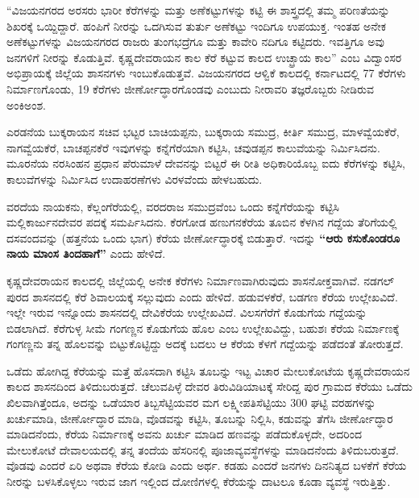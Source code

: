 “ವಿಜಯನಗರದ ಅರಸರು ಭಾರೀ ಕೆರೆಗಳನ್ನು ಮತ್ತು ಅಣೆಕಟ್ಟುಗಳನ್ನು ಕಟ್ಟಿ ಈ ಶಾಸ್ತ್ರದಲ್ಲಿ ತಮ್ಮ ಪರಿಣತೆಯನ್ನು ಶಿಖರಕ್ಕೆ ಒಯ್ದಿದ್ದಾರೆ. ಹಂಪಿಗೆ ನೀರನ್ನು ಒದಗಿಸುವ ತುರ್ತು ಅಣೆಕಟ್ಟು ಇಂದಿಗೂ ಉಪಯುಕ್ತ. ಇಂತಹ ಅನೇಕ ಅಣೆಕಟ್ಟುಗಳನ್ನು ವಿಜಯನಗರದ ರಾಜರು ತುಂಗಭದ್ರೆಗೂ ಮತ್ತು ಕಾವೇರಿ ನದಿಗೂ ಕಟ್ಟಿದರು. ಇವತ್ತಿಗೂ ಅವು ಜನಗಳಿಗೆ ನೀರನ್ನು ಕೊಡುತ್ತಿವೆ. ಕೃಷ್ಣದೇವರಾಯನ ಕಾಲ ಕೆರೆ ಕಟ್ಟುವ ಕಾಲದ ಉಚ್ಛ್ರಾಯ ಕಾಲ” ಎಂಬ ವಿದ್ವಾಂಸರ ಅಭಿಪ್ರಾಯಕ್ಕೆ ಜಿಲ್ಲೆಯ ಶಾಸನಗಳು ಇಂಬುಕೊಡುತ್ತವೆ. ವಿಜಯನಗರದ ಆಳ್ವಿಕೆ ಕಾಲದಲ್ಲಿ ಕರ್ನಾಟದಲ್ಲಿ 77 ಕೆರೆಗಳು ನಿರ್ಮಾಣಗೊಂಡು, 19 ಕೆರೆಗಳು ಜೀರ್ಣೋದ್ಧಾರಗೊಂಡವು ಎಂಬುದು ನೀರಾವರಿ ತಜ್ಞರೊಬ್ಬರು ನೀಡಿರುವ ಅಂಕಿಅಂಶ.

ಎರಡನೆಯ ಬುಕ್ಕರಾಯನ ಸಚಿವ ಭಟ್ಟರ ಬಾಚಿಯಪ್ಪನು, ಬುಕ್ಕರಾಯ ಸಮುದ್ರ, ಕೀರ್ತಿ ಸಮುದ್ರ, ಮಾಳವ್ವೆಯಕೆರೆ, ನಾಗವ್ವೆಯಕೆರೆ, ಬಾಚಪ್ಪನಕೆರೆ ಇವುಗಳನ್ನು ಕನ್ನೆಗೆರೆಯಾಗಿ ಕಟ್ಟಿಸಿ, ಚವುಡಪ್ಪನ ಕಾಲುವೆಯನ್ನು ನಿರ್ಮಿಸಿದನು. ಮೂರನೆಯ ನರಸಿಂಹನ ಪ್ರಧಾನ ಪೆರುಮಾಳೆ ದೇವನನ್ನು ಬಿಟ್ಟರೆ ಈ ರೀತಿ ಅಧಿಕಾರಿಯೊಬ್ಬ ಐದು ಕೆರೆಗಳನ್ನು ಕಟ್ಟಿಸಿ, ಕಾಲುವೆಗಳನ್ನು ನಿರ್ಮಿಸಿದ ಉದಾಹರಣೆಗಳು ವಿರಳವೆಂದು ಹೇಳಬಹುದು.

ವರದೆಯ ನಾಯಕನು, ಕೆಲ್ಲಂಗೆರೆಯಲ್ಲಿ, ವರದರಾಜ ಸಮುದ್ರವೆಂಬ ಒಂದು ಕನ್ನೆಗೆರೆಯನ್ನು ಕಟ್ಟಿಸಿ ಮಲ್ಲಿಕಾರ್ಜುನದೇವರ ಪದಕ್ಕೆ ಸಮರ್ಪಿಸಿದನು. ಕೆರಗೋಡ ಹಣುಗನಕೆರೆಯ ತೂಬಿನ ಕೆಳಗಿನ ಗದ್ದೆಯ ತೆರಿಗೆಯಲ್ಲಿ ದಸವಂದವನ್ನು (ಹತ್ತನೆಯ ಒಂದು ಭಾಗ) ಕೆರೆಯ ಜೀರ್ಣೋದ್ಧಾರಕ್ಕೆ ಬಿಡುತ್ತಾರೆ. ಇದನ್ನು \textbf{“ಆರು ಕಸುಕೊಂಡರೂ ನಾಯ ಮಾಂಸ ತಿಂದಹಾಗೆ” }ಎಂದು ಹೇಳಿದೆ.

ಕೃಷ್ಣದೇವರಾಯನ ಕಾಲದಲ್ಲಿ ಜಿಲ್ಲೆಯಲ್ಲಿ ಅನೇಕ ಕೆರೆಗಳು ನಿರ್ಮಾಣವಾಗಿರುವುದು ಶಾಸನೋಕ್ತವಾಗಿವೆ. ನಡಗಲ್​ಪುರದ ಶಾಸನದಲ್ಲಿ ಕೆರೆ ಶಿವಾಲಯಕ್ಕೆ ಸಲ್ಲುವುದು ಎಂದು ಹೇಳಿದೆ. ಹಡುವಳಕೆರೆ, ಬಡಗಣ ಕೆರೆಯ ಉಲ್ಲೇಖವಿದೆ. ಇಲ್ಲೇ ಇರುವ ಇನ್ನೊಂದು ಶಾಸನದಲ್ಲಿ ದೇವಿಕೆರೆಯ ಉಲ್ಲೇಖವಿದೆ. ವಿಲಸಗೆರೆಗೆ ಕೊಡುಗೆಯ ಗದ್ದೆಯನ್ನು ಬಿಡಲಾಗಿದೆ. ಕೆರೆಗುಳ್ಳ ಸೀಮೆ ಗಂಗಣ್ಣನ ಕೊಡುಗೆಯ ಹೊಲ ಎಂಬ ಉಲ್ಲೇಖವಿದ್ದು, ಬಹುಶಃ ಕೆರೆಯ ನಿರ್ಮಾಣಕ್ಕೆ ಗಂಗಣ್ಣನು ತನ್ನ ಹೊಲವನ್ನು ಬಿಟ್ಟುಕೊಟ್ಟಿದ್ದು ಅದಕ್ಕೆ ಬದಲು ಆ ಕೆರೆಯ ಕೆಳಗೆ ಗದ್ದೆಯನ್ನು ಪಡೆದಂತೆ ತೋರುತ್ತದೆ.

ಒಡೆದು ಹೋಗಿದ್ದ ಕೆರೆಯನ್ನು ಮತ್ತೆ ಹೊಸದಾಗಿ ಕಟ್ಟಿಸಿ ತೂಬನ್ನು ಇಟ್ಟ ವಿಚಾರ ಮೇಲುಕೋಟೆಯ ಕೃಷ್ಣದೇವರಾಯನ ಕಾಲದ ಶಾಸನದಿಂದ ತಿಳಿದುಬರುತ್ತದೆ. ಚೆಲುವಪಿಳ್ಳೆ ದೇವರ ತಿರುವಿಡಿಯಾಟಕ್ಕೆ ಸೇರಿದ್ದ ಪುರ ಗ್ರಾಮದ ಕೆರೆಯು ಒಡೆದು ಖಿಲವಾಗಿತ್ತೆಂದೂ, ಅದನ್ನು ಒಡೆಯಾರ ತಿಬ್ಬಸೆಟ್ಟಿಯವರ ಮಗ ಲಕ್ಷ್ಮೀಪತಿಸೆಟ್ಟಿಯು 300 ಘಟ್ಟಿ ವರಹಗಳನ್ನು ಖರ್ಚುಮಾಡಿ, ಜೀರ್ಣೋದ್ಧಾರ ಮಾಡಿ, ವೊಡವನ್ನು ಕಟ್ಟಿಸಿ, ತೂಬನ್ನು ನಿಲ್ಲಿಸಿ, ಕಡುವನ್ನು ತೆಗೆಸಿ ಜೀರ್ಣೋದ್ಧಾರ ಮಾಡಿದನೆಂದು, ಕೆರೆಯ ನಿರ್ಮಾಣಕ್ಕೆ ಅವನು ಖರ್ಚು ಮಾಡಿದ ಹಣವನ್ನು ಪಡೆದುಕೊಳ್ಳದೇ, ಅದರಿಂದ ಮೇಲುಕೋಟೆ ದೇವಾಲಯದಲ್ಲಿ ತನ್ನ ತಂದೆಯ ಹೆಸರಿನಲ್ಲಿ ಪೂಜಾವ್ಯವಸ್ಥೆಗಳನ್ನು ಮಾಡಿದನೆಂದು ತಿಳಿದುಬರುತ್ತದೆ. ವೊಡವು ಎಂದರೆ ಏರಿ ಅಥವಾ ಕೆರೆಯ ಕೋಡಿ ಎಂದು ಅರ್ಥ. ಕಡಹು ಎಂದರೆ ಜನಗಳು ದಿನನಿತ್ಯದ ಬಳಕೆಗೆ ಕೆರೆಯ ನೀರನ್ನು ಬಳಸಿಕೊಳ್ಳಲು ಇರುವ ಜಾಗ ಇಲ್ಲಿಂದ ದೋಣಿಗಳಲ್ಲಿ ಕೆರೆಯನ್ನು ದಾಟಲೂ ಕೂಡಾ ವ್ಯವಸ್ಥೆ ಇರುತ್ತಿತ್ತು.

